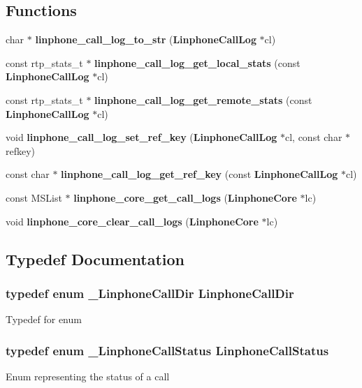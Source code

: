 \subsection*{\-Functions}
\begin{DoxyCompactItemize}
\item 
char $\ast$ {\bf linphone\-\_\-call\-\_\-log\-\_\-to\-\_\-str} ({\bf \-Linphone\-Call\-Log} $\ast$cl)
\item 
const rtp\-\_\-stats\-\_\-t $\ast$ {\bf linphone\-\_\-call\-\_\-log\-\_\-get\-\_\-local\-\_\-stats} (const {\bf \-Linphone\-Call\-Log} $\ast$cl)
\item 
const rtp\-\_\-stats\-\_\-t $\ast$ {\bf linphone\-\_\-call\-\_\-log\-\_\-get\-\_\-remote\-\_\-stats} (const {\bf \-Linphone\-Call\-Log} $\ast$cl)
\item 
void {\bf linphone\-\_\-call\-\_\-log\-\_\-set\-\_\-ref\-\_\-key} ({\bf \-Linphone\-Call\-Log} $\ast$cl, const char $\ast$refkey)
\item 
const char $\ast$ {\bf linphone\-\_\-call\-\_\-log\-\_\-get\-\_\-ref\-\_\-key} (const {\bf \-Linphone\-Call\-Log} $\ast$cl)
\item 
const \-M\-S\-List $\ast$ {\bf linphone\-\_\-core\-\_\-get\-\_\-call\-\_\-logs} ({\bf \-Linphone\-Core} $\ast$lc)
\item 
void {\bf linphone\-\_\-core\-\_\-clear\-\_\-call\-\_\-logs} ({\bf \-Linphone\-Core} $\ast$lc)
\end{DoxyCompactItemize}


\subsection{\-Typedef \-Documentation}
\subsubsection[{\-Linphone\-Call\-Dir}]{\setlength{\rightskip}{0pt plus 5cm}typedef enum {\bf \-\_\-\-Linphone\-Call\-Dir} {\bf \-Linphone\-Call\-Dir}}\label{group__call__logs_ga779ac636d8b652c5130da18827c13e5a}
\-Typedef for enum 
\subsubsection[{\-Linphone\-Call\-Status}]{\setlength{\rightskip}{0pt plus 5cm}typedef enum {\bf \-\_\-\-Linphone\-Call\-Status}  {\bf \-Linphone\-Call\-Status}}\label{group__call__logs_gafd125fb704d3254856f4a826a6e60a11}
\-Enum representing the status of a call 
